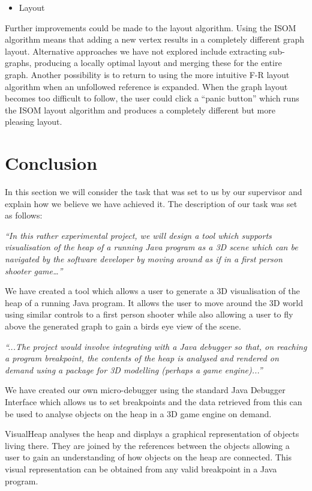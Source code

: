 \documentclass[11pt, a4paper]{report}
\begin{document}
\begin{itemize}
  \item Layout
\end{itemize}

Further improvements could be made to the layout algorithm. Using the ISOM algorithm means that adding a new vertex results in a completely different graph layout. Alternative approaches we have not explored include extracting sub-graphs, producing a locally optimal layout and merging these for the entire graph. Another possibility is to return to using the more intuitive F-R layout algorithm when an unfollowed reference is expanded. When the graph layout becomes too difficult to follow, the user could click a ``panic button'' which runs the ISOM layout algorithm and produces a completely different but more pleasing layout.

\chapter{Conclusion}

In this section we will consider the task that was set to us by our supervisor and explain how we believe we have achieved it. The description of our task was set as follows:

\emph{``In this rather experimental project, we will design a tool which supports visualisation of the heap of a running Java program as a 3D scene which can be navigated by the software developer by moving around as if in a first person shooter game…''}

We have created a tool which allows a user to generate a 3D visualisation of the heap of a running Java program. It allows the user to move around the 3D world using similar controls to a first person shooter while also allowing a user to fly above the generated graph to gain a birds eye view of the scene. 

\emph{``...The project would involve integrating with a Java debugger so that, on reaching a program breakpoint, the contents of the heap is analysed and rendered on demand using a package for 3D modelling (perhaps a game engine)...''}

We have created our own micro-debugger using the standard Java Debugger Interface which allows us to set breakpoints and the data retrieved from this can be used to analyse objects on the heap in a 3D game engine on demand.

VisualHeap analyses the heap and displays a graphical representation of objects living there. They are joined by the references between the objects allowing a user to gain an understanding of how objects on the heap are connected. This visual representation can be obtained from any valid breakpoint in a Java program.
\end{document}
